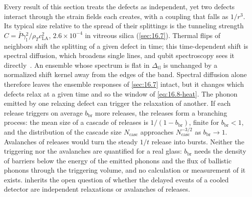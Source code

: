 Every result of this section treats the defects as independent, yet two defects interact through the strain fields each creates, with a coupling that falls as $1/r^3$. Its typical size relative to the spread of their splittings is the tunneling strength $C = \bar P\gamma_{\mathrm{l}}^2/\rho_Tc_{\mathrm{LA}}^2$, $2.6\times10^{-4}$ in vitreous silica (\cref{sec:16.7}). Thermal flips of neighbors shift the splitting of a given defect in time; this time-dependent shift is spectral diffusion, which broadens single lines, and qubit spectroscopy sees it directly~\cite[Sect.~IV]{muller2019towards}. An ensemble whose spectrum is flat in $\Delta_{\mathrm{tl}}$ is unchanged by a normalized shift kernel away from the edges of the band. Spectral diffusion alone therefore leaves the ensemble responses of \cref{sec:16.7} intact, but it changes which defects relax at a given time and so the window of \cref{eq:16.8-heat}. The phonon emitted by one relaxing defect can trigger the relaxation of another. If each release triggers on average $b_{\mathrm{br}}$ more releases, the releases form a branching process: the mean size of a cascade of releases is $1/(1 - b_{\mathrm{br}})$, finite for $b_{\mathrm{br}} < 1$, and the distribution of the cascade size $N_{\mathrm{casc}}$ approaches $N_{\mathrm{casc}}^{-3/2}$ as $b_{\mathrm{br}} \to 1$. Avalanches of releases would turn the steady $1/t$ release into bursts. Neither the triggering nor the avalanches are quantified for a real glass: $b_{\mathrm{br}}$ needs the density of barriers below the energy of the emitted phonons and the flux of ballistic phonons through the triggering volume, and no calculation or measurement of it exists.  inherits the open question of whether the delayed events of a cooled detector are independent relaxations or avalanches of releases.
